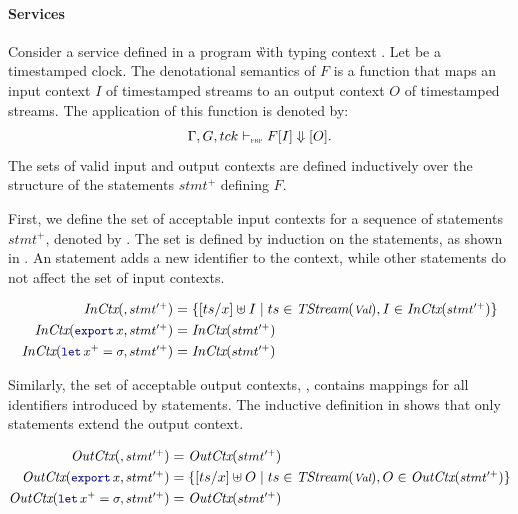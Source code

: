 \paragraph{Services}

Consider a service  defined in a program \G with typing context \tyCtx. Let \tck
be a timestamped clock. The denotational semantics of $F$ is a function that maps an input context
$I$ of timestamped streams to an output context $O$ of timestamped streams. The application of this
function is denoted by:
\begin{equation*}
    \serviceDenot{\tck}{I}{F}{O}.
\end{equation*}
The sets of valid input and output contexts are defined inductively over the structure of the
statements $stmt^+$ defining $F$.

First, we define the set of acceptable input contexts for a sequence of statements $stmt^+$, denoted
by . The set is defined by induction on the statements, as shown in . An  statement adds a new identifier to the context, while other statements do not
affect the set of input contexts.

\begin{align}
    \InputCtx{, stmt^{\prime+}}         & =
    \{ [\ts/x] \ctxconcat I \mid \ts \in \TStream{\Val}, I \in \InputCtx{stmt^{\prime+}} \} \label{eq:semantics:grfrp:inputctx:import} \\
    \InputCtx{\export{x}, stmt^{\prime+}}         & = \InputCtx{stmt^{\prime+}} \label{eq:semantics:grfrp:inputctx:export}             \\
    \InputCtx{\decl{x^+}{\sigma}, stmt^{\prime+}} & = \InputCtx{stmt^{\prime+}} \label{eq:semantics:grfrp:inputctx:decl}
\end{align}

Similarly, the set of acceptable output contexts, , contains mappings for all
identifiers introduced by  statements. The inductive definition in  shows that only  statements extend the output context.

\begin{align}
    \OutputCtx{, stmt^{\prime+}}         & = \OutputCtx{stmt^{\prime+}} \label{eq:semantics:grfrp:outputctx:import}            \\
    \OutputCtx{\export{x}, stmt^{\prime+}}         & =
    \{ [\ts/x] \ctxconcat O \mid \ts \in \TStream{\Val}, O \in \OutputCtx{stmt^{\prime+}} \} \label{eq:semantics:grfrp:outputctx:export} \\
    \OutputCtx{\decl{x^+}{\sigma}, stmt^{\prime+}} & = \OutputCtx{stmt^{\prime+}} \label{eq:semantics:grfrp:outputctx:decl}
\end{align}

